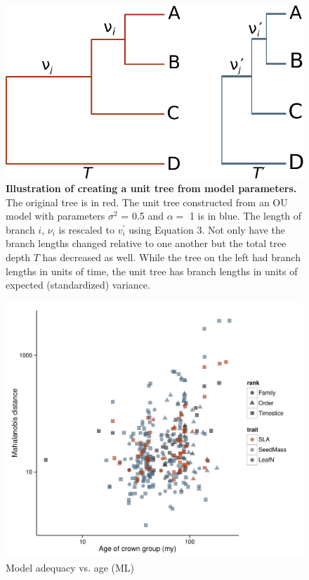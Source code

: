 \documentclass[a4paper,12pt]{article}
\begin{document}
\begin{figure}[p]
  \centering
  \includegraphics{figs/unit-tree}
  \caption{\textbf{Illustration of creating a unit tree from model parameters.} The original tree is in red. The unit tree constructed from an OU model with parameters $\sigma^2$ = 0.5 and $\alpha=$ 1 is in blue. The length of branch $i$, $\nu_i$ is rescaled to $v_i^\prime$ using Equation 3. Not only have the branch lengths changed relative to one another but the total tree depth $T$ has decreased as well. While the tree on the left had branch lengths in units of time, the unit tree has branch lengths in units of expected (standardized) variance.}
  \label{fig:box1}
\end{figure}

\renewcommand\thefigure{S\arabic{figure}}
\renewcommand\thetable{S \arabic{table}}
\setcounter{figure}{0}    
\setcounter{table}{0} 

\begin{figure}[p]
  \centering
  \includegraphics[scale=0.9]{figs/ad-age-ml}
  \caption{Model adequacy vs. age (ML)}
  \label{fig:supp-age-ml}
\end{figure}
\end{document}
